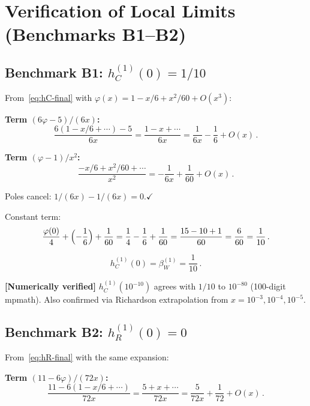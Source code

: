 \documentclass[11pt,a4paper]{article}
\theoremstyle{definition}
\theoremstyle{remark}
\newcommand{\verified}[1]{%
  \par\noindent\colorbox{green!10}{%
    \parbox{\dimexpr\linewidth-2\fboxsep}{%
      \textcolor{green!50!black}{\textbf{[Numerically verified]}}
      \textcolor{green!50!black}{#1}%
    }%
  }\par%
}
\begin{document}
\section{Verification of Local Limits (Benchmarks B1--B2)}
\label{sec:local-limits}

\subsection{Benchmark B1: $h_C^{(1)}(0) = 1/10$}

From~\eqref{eq:hC-final} with
$\varphi(x) = 1 - x/6 + x^2/60 + O(x^3)$:

\medskip\noindent
\textbf{Term $(6\varphi-5)/(6x)$:}
\begin{equation*}
  \frac{6(1 - x/6 + \cdots) - 5}{6x}
  = \frac{1 - x + \cdots}{6x}
  = \frac{1}{6x} - \frac{1}{6} + O(x)\,.
\end{equation*}

\textbf{Term $(\varphi-1)/x^2$:}
\begin{equation*}
  \frac{-x/6 + x^2/60 + \cdots}{x^2}
  = -\frac{1}{6x} + \frac{1}{60} + O(x)\,.
\end{equation*}

Poles cancel: $1/(6x) - 1/(6x) = 0$.\quad$\checkmark$

Constant term:
\begin{equation*}
  \frac{\varphi(0)}{4} + \Bigl(-\frac{1}{6}\Bigr)
  + \frac{1}{60}
  = \frac{1}{4} - \frac{1}{6} + \frac{1}{60}
  = \frac{15 - 10 + 1}{60} = \frac{6}{60} = \frac{1}{10}\,.
\end{equation*}

\begin{equation}
  \boxed{h_C^{(1)}(0) = \beta_W^{(1)} = \frac{1}{10}\,.}
  \label{eq:B1}
\end{equation}

\verified{$h_C^{(1)}(10^{-10})$ agrees with $1/10$ to $10^{-80}$
(100-digit mpmath).  Also confirmed via Richardson extrapolation
from $x = 10^{-3}, 10^{-4}, 10^{-5}$.}


\subsection{Benchmark B2: $h_R^{(1)}(0) = 0$}

From~\eqref{eq:hR-final} with the same expansion:

\medskip\noindent
\textbf{Term $(11-6\varphi)/(72x)$:}
\begin{equation*}
  \frac{11 - 6(1 - x/6 + \cdots)}{72x}
  = \frac{5 + x + \cdots}{72x}
  = \frac{5}{72x} + \frac{1}{72} + O(x)\,.
\end{equation*}
\end{document}
